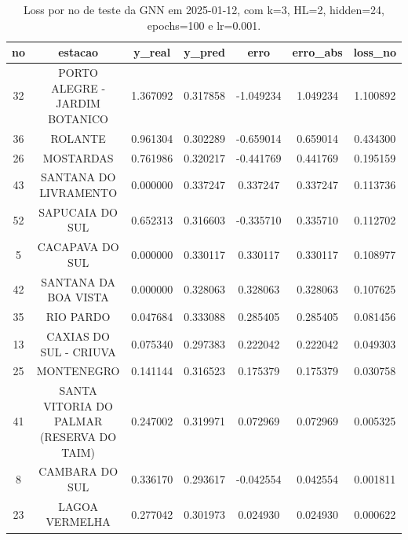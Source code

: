 \begin{table}[h]
\centering
\caption{Loss por no de teste da GNN em 2025-01-12, com k=3, HL=2, hidden=24, epochs=100 e lr=0.001.}
\label{tab:gnn_loss_k3_hl2_h24_e100_d20250112}
\begin{tabular}{ccccccc}
\toprule
no & estacao & y\_real & y\_pred & erro & erro\_abs & loss\_no \\
\midrule
32 & PORTO ALEGRE - JARDIM BOTANICO & 1.367092 & 0.317858 & -1.049234 & 1.049234 & 1.100892 \\
36 & ROLANTE & 0.961304 & 0.302289 & -0.659014 & 0.659014 & 0.434300 \\
26 & MOSTARDAS & 0.761986 & 0.320217 & -0.441769 & 0.441769 & 0.195159 \\
43 & SANTANA DO LIVRAMENTO & 0.000000 & 0.337247 & 0.337247 & 0.337247 & 0.113736 \\
52 & SAPUCAIA DO SUL & 0.652313 & 0.316603 & -0.335710 & 0.335710 & 0.112702 \\
5 & CACAPAVA DO SUL & 0.000000 & 0.330117 & 0.330117 & 0.330117 & 0.108977 \\
42 & SANTANA DA BOA VISTA & 0.000000 & 0.328063 & 0.328063 & 0.328063 & 0.107625 \\
35 & RIO PARDO & 0.047684 & 0.333088 & 0.285405 & 0.285405 & 0.081456 \\
13 & CAXIAS DO SUL - CRIUVA & 0.075340 & 0.297383 & 0.222042 & 0.222042 & 0.049303 \\
25 & MONTENEGRO & 0.141144 & 0.316523 & 0.175379 & 0.175379 & 0.030758 \\
41 & SANTA VITORIA DO PALMAR (RESERVA DO TAIM) & 0.247002 & 0.319971 & 0.072969 & 0.072969 & 0.005325 \\
8 & CAMBARA DO SUL & 0.336170 & 0.293617 & -0.042554 & 0.042554 & 0.001811 \\
23 & LAGOA VERMELHA & 0.277042 & 0.301973 & 0.024930 & 0.024930 & 0.000622 \\
\bottomrule
\end{tabular}
\end{table}
